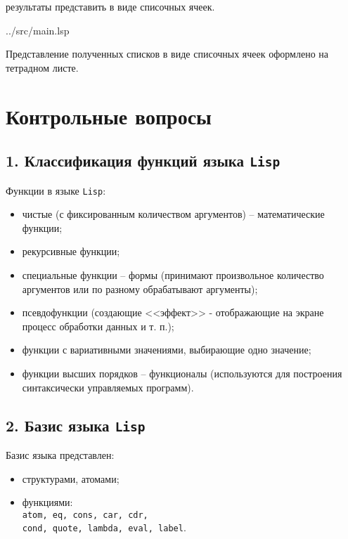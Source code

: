 результаты представить в виде списочных ячеек.

\begin{lstinputlisting}[
	caption={Задание 4},
	label={lst:t4},
	style={lsp},
	linerange={34-41},
	]{../src/main.lsp}
\end{lstinputlisting}

Представление полученных списков в виде списочных ячеек оформлено на тетрадном листе.

\section*{Контрольные вопросы}

\subsection*{1. Классификация функций языка {\texttt{Lisp}}}

Функции в языке {\texttt{Lisp}}:
\begin{itemize}
	\item чистые (с фиксированным количеством аргументов) -- математические функции;
	\item рекурсивные функции;
	\item специальные функции -- формы (принимают произвольное количество аргументов или по разному обрабатывают аргументы);
	\item псевдофункции (создающие <<эффект>> - отображающие на экране процесс обработки данных и т. п.);
	\item функции с вариативными значениями, выбирающие одно значение;
	\item функции высших порядков -- функционалы (используются для построения синтаксически управляемых программ).
\end{itemize}

\subsection*{2. Базис языка {\texttt{Lisp}}}

Базис языка представлен:
\begin{itemize}
	\item структурами, атомами;
	\item функциями:\\
	{\texttt{atom, eq, cons, car, cdr,}}\\
	{\texttt{cond, quote, lambda, eval, label}}.
\end{itemize}

